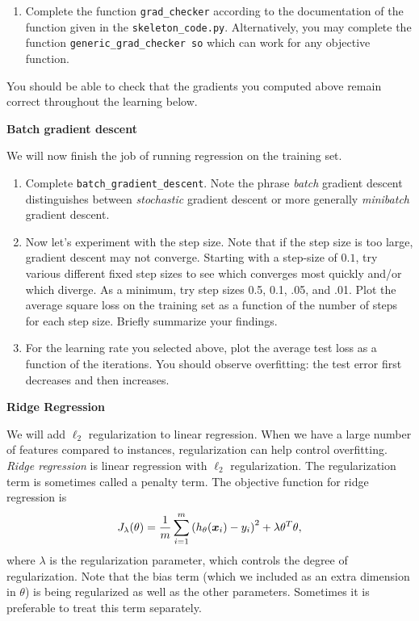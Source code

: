 \documentclass{article}
\newcommand{\nyuparagrah}[1]{\textcolor{nyupurple}{\large #1}}
\begin{document}
\begin{enumerate}
\setcounter{enumi}{\value{saveenum}}
\item Complete the function \texttt{grad\_checker} according to the documentation of the function given in the \texttt{skeleton\_code.py}. Alternatively, you may complete the function \texttt{generic\_grad\_checker
so} which can work for any objective function. 

\setcounter{saveenum}{\value{enumi}}
\end{enumerate}
You should be able to check that the gradients you computed above remain correct throughout the learning below.

\nyuparagrah{\bf Batch gradient descent}

We will now finish the job of
running regression on the training set. 

\begin{enumerate}
\setcounter{enumi}{\value{saveenum}}
\item Complete \texttt{batch\_gradient\_descent}. Note the phrase \emph{batch} gradient descent distinguishes between \emph{stochastic} gradient
descent or more generally \emph{minibatch} gradient descent. 

\item Now let's experiment with the step size. Note that if the step size
is too large, gradient descent may not converge. Starting with a step-size of $0.1$, try various different fixed
step sizes to see which converges most quickly and/or which diverge.
As a minimum, try step sizes 0.5, 0.1, .05, and .01. Plot the average square loss on the training set as a function of the number of steps for
each step size. Briefly summarize your findings. 

\item For the learning rate you selected above, plot the average test loss as a function of the iterations. You should observe overfitting: the test error first decreases and then increases.

\setcounter{saveenum}{\value{enumi}}
\end{enumerate}

\vspace{0.3cm}
\nyuparagrah{\bf Ridge Regression}

We will add $\ell_2$ regularization to linear regression. When we have a large number of features compared to instances, regularization
can help control overfitting. \emph{Ridge regression} is linear regression
with $\ell_{2}$ regularization. The regularization term is sometimes
called a penalty term. The objective function for ridge regression
is
\[
J_\lambda(\theta)=\frac{1}{m}\sum_{i=1}^{m}\left(h_{\theta}(\boldsymbol{x}_{i})-y_{i}\right)^{2}+\lambda\theta^{T}\theta,
\]
where $\lambda$ is the regularization parameter, which controls the
degree of regularization. Note that the bias term (which we included as an extra dimension in $\theta$) is being regularized
as well as the other parameters. Sometimes it is preferable to treat this term separately.
\end{document}
